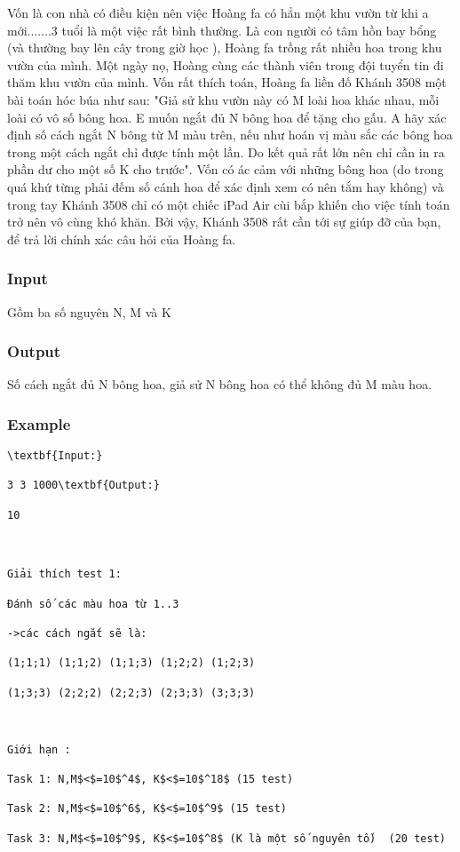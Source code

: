

Vốn là con nhà có điều kiện nên việc Hoàng fa có hẳn một khu vườn từ khi a mới.......3 tuổi là một việc rất bình thường. Là con người có tâm hồn bay bổng (và thường bay lên cây trong giờ học ), Hoàng fa trồng rất nhiều hoa trong khu vườn của mình. Một ngày nọ, Hoàng cùng các thành viên trong đội tuyển tin đi thăm khu vườn của mình. Vốn rất thích toán, Hoàng fa liền đố Khánh 3508 một bài toán hóc búa như sau: "Giả sử khu vườn này có M loài hoa khác nhau, mỗi loài có vô số bông hoa. E muốn ngắt đủ N bông hoa để tặng cho gấu. A hãy xác định số cách ngắt N bông từ M màu trên, nếu như hoán vị màu sắc các bông hoa trong một cách ngắt chỉ được tính một lần. Do kết quả rất lớn nên chỉ cần in ra phần dư cho một số K cho trước". Vốn có ác cảm với những bông hoa (do trong quá khứ từng phải đếm số cánh hoa để xác định xem có nên tắm hay không) và trong tay Khánh 3508 chỉ có một chiếc iPad Air cùi bắp khiến cho việc tính toán trở nên vô cùng khó khăn. Bởi vậy, Khánh 3508 rất cần tới sự giúp đỡ của bạn, để trả lời chính xác câu hỏi của Hoàng fa.

\subsubsection{Input}

Gồm ba số nguyên N, M và K

\subsubsection{Output}

Số cách ngắt đủ N bông hoa, giả sử N bông hoa có thể không đủ M màu hoa.

\subsubsection{Example}
\begin{verbatim}
\textbf{Input:}

3 3 1000\textbf{Output:}

10

 

Giải thích test 1:

Đánh số các màu hoa từ 1..3

->các cách ngắt sẽ là:

(1;1;1) (1;1;2) (1;1;3) (1;2;2) (1;2;3)

(1;3;3) (2;2;2) (2;2;3) (2;3;3) (3;3;3)\end{verbatim}
\begin{verbatim}


Giới hạn :

Task 1: N,M$<$=10$^4$, K$<$=10$^18$ (15 test)

Task 2: N,M$<$=10$^6$, K$<$=10$^9$ (15 test)

Task 3: N,M$<$=10$^9$, K$<$=10$^8$ (K là một số nguyên tố)  (20 test)\end{verbatim}
